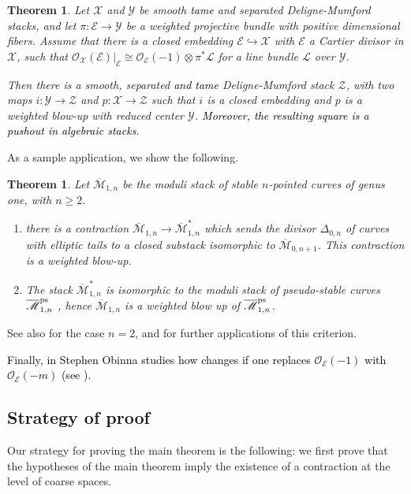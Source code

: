 \documentclass{amsart}
\newcommand{\cE}{\mathcal{E}}
\newcommand{\cL}{\mathcal{L}}
\newcommand{\cO}{\mathcal{O}}
\newcommand{\cX}{\mathcal{X}}
\newcommand{\cY}{\mathcal{Y}}
\newcommand{\cZ}{\mathcal{Z}}
\newtheorem{Teo}[theorem]{Theorem}
\theoremstyle{definition}
\begin{document}
 \begin{Teo}\label{Thm_intro}Let $\cX$ and $\cY$ be smooth \textcolor{black}{tame} and separated Deligne-Mumford stacks, and let $\pi:\cE\to \cY$ be a weighted projective bundle with positive dimensional fibers. Assume that there is a closed embedding $\cE\hookrightarrow \cX$ with
  $\cE$ a Cartier divisor in $\cX$, such that $\cO_\cX(\cE)|_\cE\cong\cO_{\cE}(-1)\otimes \pi^*\cL$ for a line bundle $\cL$ over $\cY$.
  
  Then there is a smooth, separated \textcolor{black}{and tame} Deligne-Mumford stack $\cZ$, with two maps $i: \cY\to \cZ$ and $p: \cX\to \cZ$ such that $i$ is a closed embedding and $p$ is a weighted blow-up with reduced center $\cY$. \textcolor{black}{Moreover, the resulting square is a pushout in algebraic stacks.}
 \end{Teo}

As a sample application, we show the following.
\begin{Teo}\label{thm:application intro}
    Let $\overline{\mathscr{M}}_{1,n}$ be the moduli stack of stable $n$-pointed curves of genus one, with $n\geq 2$.
    \begin{enumerate}
        \item there is a contraction $\overline{\mathscr{M}}_{1,n}\to \overline{\mathscr{M}}^*_{1,n}$ which sends the divisor $\Delta_{0,n}$ of curves with elliptic tails to a closed substack isomorphic to $\overline{\mathscr{M}}_{0,n+1}$. This contraction is a weighted blow-up.
        \item The stack $\overline{\mathscr{M}}_{1,n}^*$ is isomorphic to the moduli stack of pseudo-stable curves $\overline{\mathscr{M}}_{1,n}^{\rm{ps}}$ \cite[Sec. 5]{Sch}, hence $\overline{\mathscr{M}}_{1,n}$ is a weighted blow up of $\overline{\mathscr{M}}_{1,n}^{\rm{ps}}$.
    \end{enumerate}
\end{Teo}
See also \cite{Inc} for the case $n=2$, and \cite{BDL} for further applications of this criterion.

\textcolor{black}{Finally, in  Stephen Obinna studies how  changes if one replaces $\cO_\cE(-1)$ with $\cO_\cE(-m)$ (see ).}
\subsection{Strategy of proof}
Our strategy for proving the main theorem is the following: we first prove that the hypotheses of the main theorem imply the existence of a contraction at the level of coarse spaces. 
\end{document}
